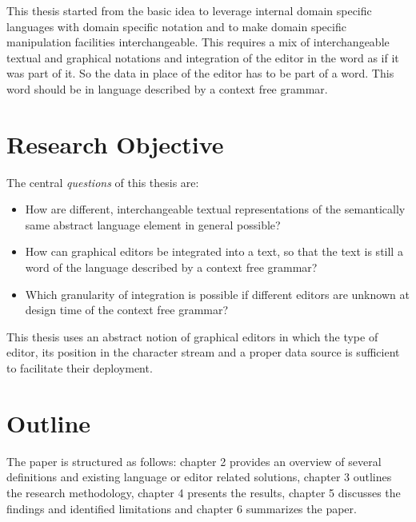 This thesis started from the basic idea to leverage internal domain specific languages with domain specific notation and to make domain specific manipulation facilities interchangeable. This requires a mix of interchangeable textual and graphical notations and integration of the editor in the word as if it was part of it. So the data in place of the editor has to be part of a word. This word should be in language described by a context free grammar.
 


\section{Research Objective}
The central \emph{questions} of this thesis are:
\begin{itemize}
	\item How are different, interchangeable textual representations of the semantically same abstract language element in general possible?
	\item How can graphical editors be integrated into a text, so that the text is still a word of the language described by a context free grammar?
	\item Which granularity of integration is possible if different editors are unknown at design time of the context free grammar?
\end{itemize}

This thesis uses an abstract notion of graphical editors in which the type of editor, its position in the character stream and a proper data source is sufficient to facilitate their deployment.


\section{Outline}
The paper is structured as follows: chapter 2 provides an overview of several definitions and existing language or editor related solutions, chapter 3 outlines the research methodology, chapter 4 presents the results, chapter 5 discusses the findings and identified limitations and chapter 6 summarizes the paper.

